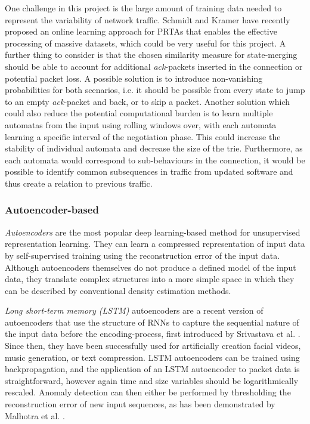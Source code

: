 \documentclass[a4paper,12pt,twoside]{report}
\begin{document}
One challenge in this project is the large amount of training data needed to represent the variability of network traffic. Schmidt and Kramer \cite{schmidt2014online} have recently proposed an online learning approach for PRTAs that enables the effective processing of massive datasets, which could be very useful for this project. A further thing to consider is that the chosen similarity measure for state-merging should be able to account for additional \textit{ack}-packets inserted in the connection or potential packet loss. A possible solution is to introduce non-vanishing probabilities for both scenarios, i.e. it should be possible from every state to jump to an empty \textit{ack}-packet and back, or to skip a packet. Another solution which could also reduce the potential computational burden is to learn multiple automatas from the input using rolling windows over, with each automata learning a specific interval of the negotiation phase. This could increase the stability of individual automata and decrease the size of the trie. Furthermore, as each automata would correspond to sub-behaviours in the connection, it would be possible to identify common subsequences in traffic from updated software and thus create a relation to previous traffic. 

\subsubsection{Autoencoder-based}

\textit{Autoencoders} are the most popular deep learning-based method for unsupervised representation learning. They can learn a compressed representation of input data by self-supervised training using the reconstruction error of the input data. Although autoencoders themselves do not produce a defined model of the input data, they translate complex structures into a more simple space in which they can be described by conventional density estimation methods. 

\textit{Long short-term memory (LSTM)} autoencoders are a recent version of autoencoders that use the structure of RNNs to capture the sequential nature of the input data before the encoding-process, first introduced by Srivastava et al. \cite{srivastava2015unsupervised}. Since then, they have been successfully used for artificially creation facial videos, music generation, or text compression.
LSTM autoencoders can be trained using backpropagation, and the application of an LSTM autoencoder to packet data is straightforward, however again time and size variables should be logarithmically rescaled. Anomaly detection can then either be performed by thresholding the reconstruction error of new input sequences, as has been demonstrated by Malhotra et al. \cite{malhotra2016lstm}.
 
\end{document}
